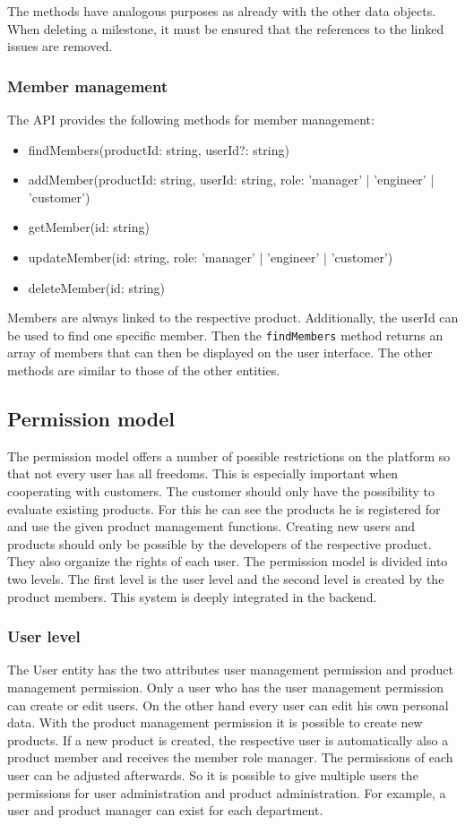     The methods have analogous purposes as already with the other data objects. When deleting a milestone, it must be ensured that the references to the linked issues are removed.

    \subsubsection*{Member management}
    The API provides the following methods for member management:

    \begin{itemize}
        \item findMembers(productId: string, userId?: string)
        \item addMember(productId: string, userId: string, role: 'manager' | 'engineer' | 'customer')
        \item getMember(id: string)
        \item updateMember(id: string, role: 'manager' | 'engineer' | 'customer')
        \item deleteMember(id: string)
    \end{itemize}

    Members are always linked to the respective product. Additionally, the userId can be used to find one specific member. Then the \texttt{findMembers} method returns an array of members that can then be displayed on the user interface. The other methods are similar to those of the other entities.

    \subsection*{Permission model}
    The permission model offers a number of possible restrictions on the platform so that not every user has all freedoms. This is especially important when cooperating with customers. The customer should only have the possibility to evaluate existing products. For this he can see the products he is registered for and use the given product management functions. Creating new users and products should only be possible by the developers of the respective product. They also organize the rights of each user. The permission model is divided into two levels. The first level is the user level and the second level is created by the product members. This system is deeply integrated in the backend.

    \subsubsection*{User level}
    The User entity has the two attributes user management permission and product management permission. Only a user who has the user management permission can create or edit users. On the other hand every user can edit his own personal data. With the product management permission it is possible to create new products. If a new product is created, the respective user is automatically also a product member and receives the member role manager. The permissions of each user can be adjusted afterwards. So it is possible to give multiple users the permissions for user administration and product administration. For example, a user and product manager can exist for each department. 

